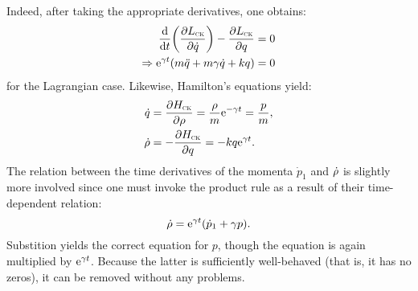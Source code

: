 Indeed, after taking the appropriate derivatives, one obtains:
\begin{equation*} 
    \begin{split}
        \dv{}{t}\qty(\pdv{\ensuremath{L_\text{\tiny{\textsc{CK}}}}}{\dot{q}}) - \pdv{\ensuremath{L_\text{\tiny{\textsc{CK}}}}}{q} &= 0 \\
        \Rightarrow \mathrm{e}^{\gamma t}\qty(m\ddot{q} + m\gamma\dot{q} + kq) &= 0
    \end{split}
\end{equation*}
for the Lagrangian case. Likewise, Hamilton's equations yield: \cite{Tokieda2021}
\begin{equation*}
    \begin{split}
        \dot{q} &= \pdv{\ensuremath{H_\text{\tiny{\textsc{CK}}}}}{\ensuremath{\rho}} = \frac{\rho}{m}\mathrm{e}^{-\gamma t} =  \frac{p}{m}, \\
        \dot{\rho} &= -\pdv{\ensuremath{H_\text{\tiny{\textsc{CK}}}}}{q} = -kq\mathrm{e}^{\gamma t}.\\
    \end{split}
\end{equation*}
The relation between the time derivatives of the momenta $\dot{p}_1$ and $\dot{\rho}$ is slightly more involved since one must invoke the product rule as a result of their time-dependent relation:
    $$ \dot{\rho} = \mathrm{e}^{\gamma t}\qty(\dot{p}_1 + \gamma p). $$
Substition yields the correct equation for $p$, though the equation is again multiplied by $\mathrm{e}^{\gamma t}$. Because the latter is sufficiently well-behaved (that is, it has no zeros), it can be removed without any problems.

